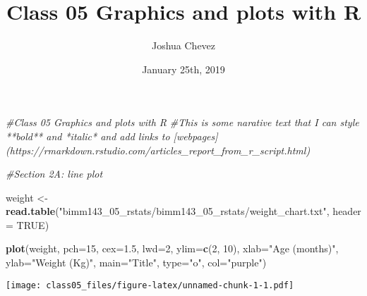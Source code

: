 \documentclass[]{article}
\title{Class 05 Graphics and plots with R}
\author{Joshua Chevez}
\date{January 25th, 2019}
\newenvironment{Shaded}{\begin{snugshade}}{\end{snugshade}}
\newcommand{\KeywordTok}[1]{\textcolor[rgb]{0.13,0.29,0.53}{\textbf{#1}}}
\newcommand{\DataTypeTok}[1]{\textcolor[rgb]{0.13,0.29,0.53}{#1}}
\newcommand{\DecValTok}[1]{\textcolor[rgb]{0.00,0.00,0.81}{#1}}
\newcommand{\FloatTok}[1]{\textcolor[rgb]{0.00,0.00,0.81}{#1}}
\newcommand{\CharTok}[1]{\textcolor[rgb]{0.31,0.60,0.02}{#1}}
\newcommand{\StringTok}[1]{\textcolor[rgb]{0.31,0.60,0.02}{#1}}
\newcommand{\CommentTok}[1]{\textcolor[rgb]{0.56,0.35,0.01}{\textit{#1}}}
\newcommand{\OtherTok}[1]{\textcolor[rgb]{0.56,0.35,0.01}{#1}}
\newcommand{\OperatorTok}[1]{\textcolor[rgb]{0.81,0.36,0.00}{\textbf{#1}}}
\newcommand{\NormalTok}[1]{#1}
\begin{document}
\maketitle

\begin{Shaded}
\begin{Highlighting}[]
\CommentTok{#Class 05 Graphics and plots with R}
\CommentTok{#This is some narative text that I can style **bold** and *italic* and add links to [webpages](https://rmarkdown.rstudio.com/articles_report_from_r_script.html)}

\CommentTok{#Section 2A: line plot}

\NormalTok{weight <-}\StringTok{ }\KeywordTok{read.table}\NormalTok{(}\StringTok{"bimm143_05_rstats/bimm143_05_rstats/weight_chart.txt"}\NormalTok{, }\DataTypeTok{header =} \OtherTok{TRUE}\NormalTok{)}

\KeywordTok{plot}\NormalTok{(weight, }\DataTypeTok{pch=}\DecValTok{15}\NormalTok{, }\DataTypeTok{cex=}\FloatTok{1.5}\NormalTok{, }\DataTypeTok{lwd=}\DecValTok{2}\NormalTok{, }\DataTypeTok{ylim=}\KeywordTok{c}\NormalTok{(}\DecValTok{2}\NormalTok{, }\DecValTok{10}\NormalTok{), }\DataTypeTok{xlab=}\StringTok{"Age (months)"}\NormalTok{, }\DataTypeTok{ylab=}\StringTok{"Weight (Kg)"}\NormalTok{, }\DataTypeTok{main=}\StringTok{"Title"}\NormalTok{, }\DataTypeTok{type=}\StringTok{"o"}\NormalTok{, }\DataTypeTok{col=}\StringTok{"purple"}\NormalTok{)}
\end{Highlighting}
\end{Shaded}

\texttt{[image: class05\_files/figure-latex/unnamed-chunk-1-1.pdf]}

\begin{Shaded}
\end{Shaded}
\end{document}
